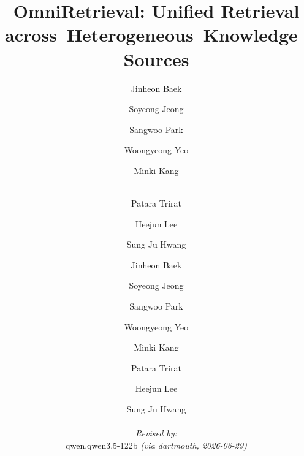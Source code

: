 \documentclass[10pt,a4paper,logo]{paper}
\title{OmniRetrieval: Unified Retrieval across~Heterogeneous~Knowledge~Sources}
\author[1]{Jinheon Baek}
\author[1]{Soyeong Jeong}
\author[1]{Sangwoo Park}
\author[1]{Woongyeong Yeo}
\author[1]{Minki Kang}
\author[2]{\\Patara Trirat}
\author[2]{Heejun Lee}
\author[1,2]{Sung Ju Hwang}
\affil[1]{KAIST}
\affil[2]{DeepAuto.ai}
\author{
  Jinheon Baek \and Soyeong Jeong \and Sangwoo Park \and Woongyeong Yeo \and Minki Kang \and Patara Trirat \and Heejun Lee \and Sung Ju Hwang
  \par\hrule\par
  \textit{Revised by:}\\
  qwen.qwen3.5-122b \textit{(via dartmouth, 2026-06-29)}
}
\begin{document}
\maketitle











\clearpage
\appendix{}
\end{document}
